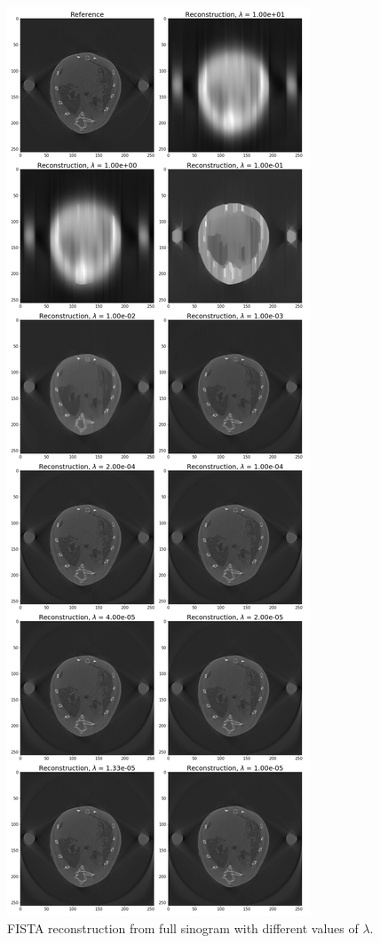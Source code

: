 \documentclass[11pt]{article}
\begin{document}
\newpage
\setcounter{figure}{0}
\renewcommand{\thefigure}{S\arabic{figure}}
\begin{figure}[h]
	\centering
	\includegraphics[height=0.8\paperheight]{results/fistaFullImages.png}
	\caption{FISTA reconstruction from full sinogram with different values of $\lambda$.}
	\label{fig:fullReconstructions}
\end{figure}
\end{document}
